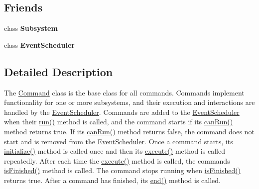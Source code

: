 \subsection*{Friends}
\begin{DoxyCompactItemize}
\item 
\mbox{\label{classlib_iterative_robot_1_1_command_a9b67dc4c93b18626e753aa0938abbf7d}} 
class {\bfseries Subsystem}
\item 
\mbox{\label{classlib_iterative_robot_1_1_command_a2a47195be57876de9e0c9e18467a34a3}} 
class {\bfseries Event\+Scheduler}
\end{DoxyCompactItemize}


\subsection{Detailed Description}
The \mbox{\hyperlink{classlib_iterative_robot_1_1_command}{Command}} class is the base class for all commands. Commands implement functionality for one or more subsystems, and their execution and interactions are handled by the \mbox{\hyperlink{classlib_iterative_robot_1_1_event_scheduler}{Event\+Scheduler}}. Commands are added to the \mbox{\hyperlink{classlib_iterative_robot_1_1_event_scheduler}{Event\+Scheduler}} when their \mbox{\hyperlink{classlib_iterative_robot_1_1_command_a3f3790d1b8033d7253a9f44481032ee9}{run()}} method is called, and the command starts if its \mbox{\hyperlink{classlib_iterative_robot_1_1_command_aebef0fdf029a15ee48fbb778c4265609}{can\+Run()}} method returns true. If its \mbox{\hyperlink{classlib_iterative_robot_1_1_command_aebef0fdf029a15ee48fbb778c4265609}{can\+Run()}} method returns false, the command does not start and is removed from the \mbox{\hyperlink{classlib_iterative_robot_1_1_event_scheduler}{Event\+Scheduler}}. Once a command starts, its \mbox{\hyperlink{classlib_iterative_robot_1_1_command_a14543c9d38b07e52f9ffb2af88a63f60}{initialize()}} method is called once and then its \mbox{\hyperlink{classlib_iterative_robot_1_1_command_a4b38164af1a8645fae2fdae296317cf4}{execute()}} method is called repeatedly. After each time the \mbox{\hyperlink{classlib_iterative_robot_1_1_command_a4b38164af1a8645fae2fdae296317cf4}{execute()}} method is called, the command\textquotesingle{}s \mbox{\hyperlink{classlib_iterative_robot_1_1_command_a8e4dccdd88f432a716090f532ba097f7}{is\+Finished()}} method is called. The command stops running when \mbox{\hyperlink{classlib_iterative_robot_1_1_command_a8e4dccdd88f432a716090f532ba097f7}{is\+Finished()}} returns true. After a command has finished, its \mbox{\hyperlink{classlib_iterative_robot_1_1_command_ab30847f09859387b70bb7846f7ce7ca4}{end()}} method is called.

